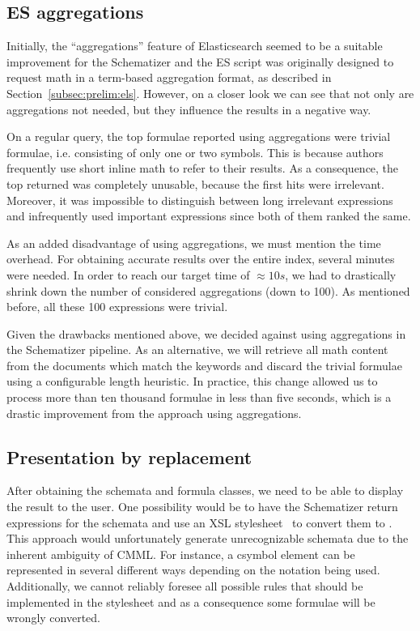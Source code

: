 \subsection{ES aggregations}\label{subsec:esagg}
Initially, the ``aggregations'' feature of Elasticsearch seemed to be a
suitable improvement for the Schematizer and the ES script was originally
designed to request math in a term-based aggregation format, as described in
Section~\ref{subsec:prelim:els}. However, on a closer look we can see that not
only are aggregations not needed, but they influence the results in a negative
way.

On a regular query, the top formulae reported using aggregations were trivial
formulae, i.e. consisting of only one or two symbols. This is because authors
frequently use short inline math to refer to their results. As a consequence,
the top returned was completely unusable, because the first hits were
irrelevant. Moreover, it was impossible to distinguish between long irrelevant
expressions and infrequently used important expressions since both of them
ranked the same.

As an added disadvantage of using aggregations, we must mention the time
overhead. For obtaining accurate results over the entire index, several
minutes were needed. In order to reach our target time of $\approx 10s$, we had to
drastically shrink down the number of considered aggregations (down to 100).
As mentioned before, all these 100 expressions were trivial.

Given the drawbacks mentioned above, we decided against using aggregations in
the Schematizer pipeline. As an alternative, we will retrieve all math content
from the documents which match the keywords and discard the trivial formulae
using a configurable length heuristic. In practice, this change allowed us to
process more than ten thousand formulae in less than five seconds, which is a
drastic improvement from the approach using aggregations.

\subsection{Presentation by replacement}\label{subsec:make_sch_recog}
After obtaining the schemata and formula classes, we need to be able to display
the result to the user. One possibility would be to have the Schematizer return
\cmml expressions for the schemata and use an XSL
stylesheet~\cite{carlisle:online} to convert them to \pmml. This approach
would unfortunately generate unrecognizable schemata due to the inherent
ambiguity of CMML. For instance, a \textsf{csymbol} element can be
represented in several different ways depending on the notation being used.
Additionally, we cannot reliably foresee all possible rules that should be
implemented in the stylesheet and as a consequence some formulae will be
wrongly converted.

